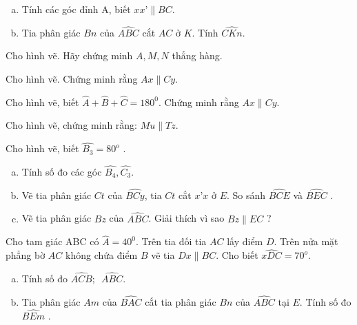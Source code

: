 \begin{bt}
\begin{enumerate}[a)]
\item Tính các góc đỉnh A,  biết $xx’ \parallel BC$.
\item Tia phân giác $Bn$ của $\widehat{ABC}$ cắt $AC$ ở $K$. Tính $\widehat{CKn}$.
\end{enumerate}
\end{bt}   \begin{bt}
Cho hình vẽ. Hãy chứng minh $A, M, N$  thẳng hàng.
\end{bt}   \begin{bt}
Cho hình vẽ. Chứng minh rằng $Ax \parallel Cy$.
\end{bt}   \begin{bt}
Cho hình vẽ, biết $\widehat{A}+\widehat{B}+\widehat{C}={{180}^{0}}$. Chứng minh rằng $Ax \parallel Cy$.
\end{bt}   \begin{bt}
Cho hình vẽ, chứng minh rằng:  $Mu \parallel Tz$.
\end{bt}   \begin{bt}
Cho hình vẽ, biết $\widehat{{{B}_{3}}}={{80}^{o}}$ .
\begin{enumerate}[a)]
\item 	Tính số đo các góc $\widehat{{{B}_{4}}},\widehat{{{C}_{3}}}$.
\item 	Vẽ tia phân giác $Ct$ của $\widehat{BCy}$, tia $Ct$ cắt $x’x$ ở $E$. So sánh $\widehat{BCE}$ và $\widehat{BEC}$ .
\item	Vẽ tia phân giác $Bz$ của $\widehat{ABC}$. Giải thích vì sao $Bz \parallel EC$ ?
\end{enumerate}

\end{bt}   \begin{bt}
Cho tam giác ABC có $\widehat{A}={{40}^{0}}$. Trên tia đối tia $AC$ lấy điểm $D$. Trên nửa mặt phẳng bờ $AC$ không chứa điểm $B$ vẽ tia $Dx \parallel BC$. Cho biết $\widehat{xDC}={{70}^{o}}$.
\begin{enumerate}[a)]
\item Tính số đo $\widehat{ACB};\,\,\,\widehat{ABC}$.
\item 	Tia phân giác $Am$ của $\widehat{BAC}$ cắt tia phân giác $Bn$ của $\widehat{ABC}$ tại $E$. Tính số đo $\widehat{BEm}$ .
\end{enumerate}


\end{bt}
